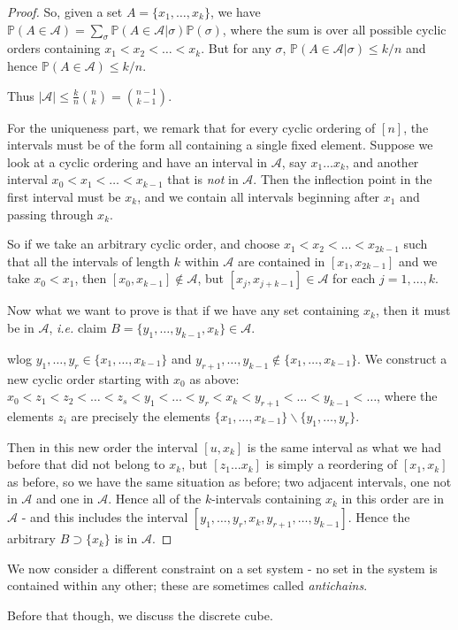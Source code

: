 \documentclass[]{article}
\theoremstyle{custhm}
\theoremstyle{cusdef}
\theoremstyle{custhm}
\theoremstyle{custhm}
\theoremstyle{custhm}
\theoremstyle{custhm}
\theoremstyle{cusdef}
\theoremstyle{remark}
\theoremstyle{custhm}
\newcommand{\ie}{\textit{i.e. }}
\renewcommand{\P}{\mathbb{P}}
\renewcommand{\it}[1]{\textit{#1}}
\newcommand{\A}{\mathcal{A}}
\begin{document}
\begin{proof}
So, given a set $A = \{x_1,\dots,x_k\}$, we have $\P(A\in \A) = \sum_{\sigma}\P(A\in \A|\sigma)\P(\sigma)$, where the sum is over all possible cyclic orders containing $x_1<x_2<\dots < x_k$. But for any $\sigma$, $\P(A\in \A|\sigma) \le k/n$ and hence $\P(A\in\A)\le k/n$.

Thus $|\A| \le \frac{k}{n}{n\choose k} = {n-1\choose k-1}$.

For the uniqueness part, we remark that for every cyclic ordering of $[n]$, the intervals must be of the form all containing a single fixed element. Suppose we look at a cyclic ordering and have an interval in $\A$, say $x_1\dots x_k$, and another interval $x_0 < x_1 < \dots < x_{k-1}$ that is \it{not} in $\A$. Then the inflection point in the first interval must be $x_k$, and we contain all intervals beginning after $x_1$ and passing through $x_k$.

So if we take an arbitrary cyclic order, and choose $x_1 < x_2 < \dots < x_{2k-1}$ such that all the intervals of length $k$ within $\A$ are contained in $[x_1,x_{2k-1}]$ and we take $x_0 < x_1$, then $[x_0,x_{k-1}]\not\in\A$, but $[x_j,x_{j+k-1}]\in\A$ for each $j = 1,\dots,k$.

Now what we want to prove is that if we have any set containing $x_k$, then it must be in $\A$, \ie claim $B = \{y_1,\dots,y_{k-1},x_k\}\in\A$.

wlog $y_1,\dots,y_r\in\{x_1,\dots,x_{k-1}\}$ and $y_{r+1},\dots,y_{k-1}\not\in\{x_1,\dots,x_{k-1}\}$. We construct a new cyclic order starting with $x_0$ as above: $x_0 < z_1 < z_2 < \dots < z_s < y_1 < \dots < y_r < x_{k} < y_{r+1}<\dots <y_{k-1}<\dots$, where the elements $z_i$ are precisely the elements $\{x_1,\dots,x_{k-1}\}\backslash \{y_1,\dots,y_r\}$.

Then in this new order the interval $[u,x_k]$ is the same interval as what we had before that did not belong to $x_k$, but $[z_1\dots x_k]$ is simply a reordering of $[x_1,x_k]$ as before, so we have the same situation as before; two adjacent intervals, one not in $\A$ and one in $\A$. Hence all of the $k$-intervals containing $x_k$ in this order are in $\A$ - and this includes the interval $[y_1,\dots,y_r,x_k,y_{r+1},\dots,y_{k-1}]$. Hence the arbitrary $B\supset \{x_k\}$ is in $\A$.
\end{proof}

We now consider a different constraint on a set system - no set in the system is contained within any other; these are sometimes called \it{antichains}.

Before that though, we discuss the discrete cube.
\end{document}
